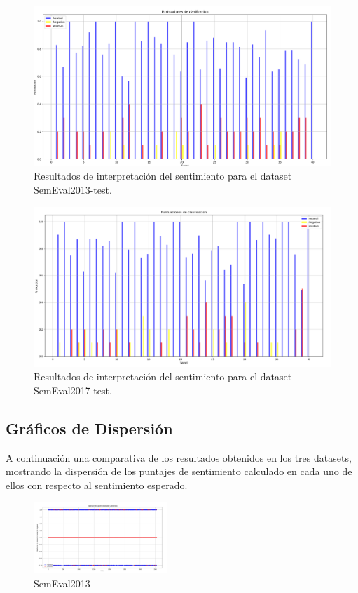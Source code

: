 \documentclass[sigconf, review=false, nonacm]{acmart}
\begin{document}
\begin{figure}[H]
	\centering
	\includegraphics[width=\linewidth]{../results/barras/semeval2013.png}
	\caption{Resultados de interpretación del sentimiento para el dataset SemEval2013-test.}
	\label{fig:semeval2013}
\end{figure}

\begin{figure}[H]
	\centering
	\includegraphics[width=\linewidth]{../results/barras/semeval2017.png}
	\caption{Resultados de interpretación del sentimiento para el dataset SemEval2017-test.}
	\label{fig:semeval2017}
\end{figure}

\subsection{Gráficos de Dispersión}
A continuación una comparativa de los resultados obtenidos en los tres datasets, mostrando la dispersión de los
puntajes de sentimiento calculado en cada uno de ellos con respecto al sentimiento esperado.

\begin{figure}[H]
	\centering
	\includegraphics[width=0.45\textwidth]{../results/dispersion/semeval2013.png}
	\caption{SemEval2013}
	\label{fig:semeval2013}
\end{figure}
\end{document}
